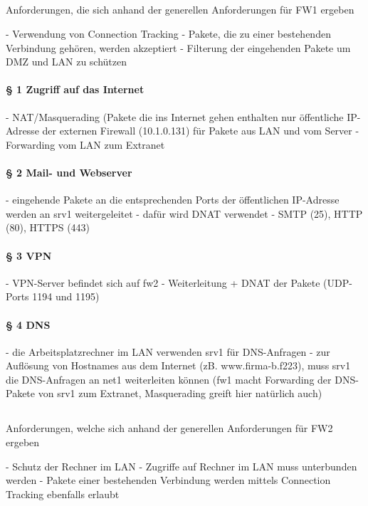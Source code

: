 \subsection{\fwa}

Anforderungen, die sich anhand der generellen Anforderungen für FW1 ergeben

- Verwendung von Connection Tracking
  - Pakete, die zu einer bestehenden Verbindung gehören, werden akzeptiert
  - Filterung der eingehenden Pakete um DMZ und LAN zu schützen

\paragraph{§ 1 Zugriff auf das Internet}
- NAT/Masquerading (Pakete die ins Internet gehen enthalten nur öffentliche IP-Adresse der externen Firewall (10.1.0.131) für Pakete aus LAN und vom Server
- Forwarding vom LAN zum Extranet

\paragraph{§ 2 Mail- und Webserver}
- eingehende Pakete an die entsprechenden Ports der öffentlichen IP-Adresse werden an srv1 weitergeleitet
- dafür wird DNAT verwendet
- SMTP (25), HTTP (80), HTTPS (443)

\paragraph{§ 3 VPN}
- VPN-Server befindet sich auf fw2
- Weiterleitung + DNAT der Pakete (UDP-Ports 1194 und 1195)

\paragraph{§ 4 DNS}
- die Arbeitsplatzrechner im LAN verwenden srv1 für DNS-Anfragen
- zur Auflösung von Hostnames aus dem Internet (zB. www.firma-b.f223), muss srv1 die DNS-Anfragen an net1 weiterleiten können (fw1 macht Forwarding der DNS-Pakete von srv1 zum Extranet, Masquerading greift hier natürlich auch)


\subsection{\fwb}

Anforderungen, welche sich anhand der generellen Anforderungen für FW2 ergeben

- Schutz der Rechner im LAN
- Zugriffe auf Rechner im LAN muss unterbunden werden
- Pakete einer bestehenden Verbindung werden mittels Connection Tracking ebenfalls erlaubt

